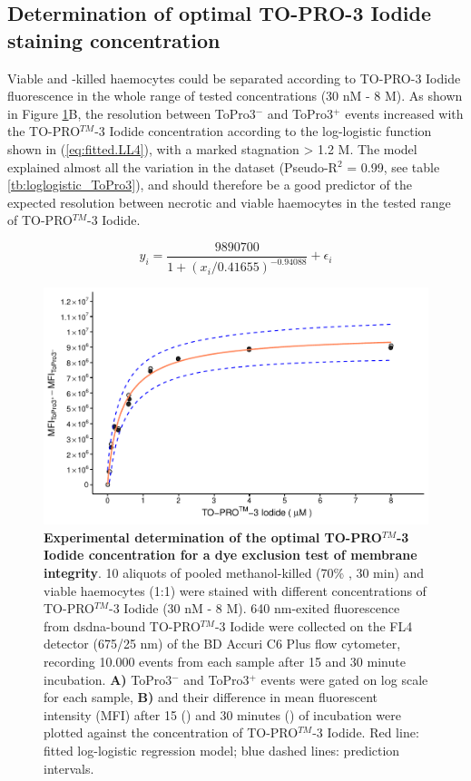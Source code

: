 \subsection{Determination of optimal TO-PRO-3 Iodide staining concentration}
Viable and -killed haemocytes could be separated according to TO-PRO-3 Iodide fluorescence in the whole range of tested concentrations (30 nM - 8 \micro M). As shown in Figure \ref{fig:ToPro3_stain_opt}B, the resolution between ToPro3$^{-}$ and ToPro3$^{+}$ events increased with the TO-PRO$^{TM}$-3 Iodide concentration according to the log-logistic function shown in (\ref{eq:fitted.LL4}), with a marked stagnation > 1.2 \micro M. The model explained almost all the variation in the dataset (Pseudo-R$^{2}$ = 0.99, see table \ref{tb:loglogistic_ToPro3}), and should therefore be a good predictor of the expected resolution between necrotic and viable haemocytes in the tested range of TO-PRO$^{TM}$-3 Iodide.

\begin{equation}
\label{eq:fitted.LL4}
y_{i} = \dfrac{9890700}{1 + (x_i / 0.41655)^{-0.94088}} + \epsilon_i
\end{equation}

\begin{figure}[h]
    \centering
    \includegraphics[width=1.0\textwidth]{figures/Method development/ToPro3 LL4.pdf}
    \caption{\textbf{Experimental determination of the optimal TO-PRO$^{TM}$-3 Iodide concentration for a dye exclusion test of membrane integrity}. 10 aliquots of pooled methanol-killed (70\% , 30 min) and viable haemocytes (1:1) were stained with different concentrations of TO-PRO$^{TM}$-3 Iodide (30 nM - 8 \micro M). 640 nm-exited fluorescence from \acrshort{dsdna}-bound TO-PRO$^{TM}$-3 Iodide were collected on the FL4 detector (675/25 nm) of the BD Accuri C6 Plus flow cytometer, recording 10.000 events from each sample after 15 and 30 minute incubation. \textbf{A)} ToPro3$^{-}$ and ToPro3$^{+}$ events were gated on log scale for each sample, \textbf{B)} and their difference in mean fluorescent intensity (MFI) after 15 (\protect\lysegraacircle) and 30 minutes (\protect\darkgraycircle) of incubation were plotted against the concentration of TO-PRO$^{TM}$-3 Iodide. Red line: fitted log-logistic regression model; blue dashed lines: prediction intervals.}
    \label{fig:ToPro3_stain_opt}
\end{figure}

